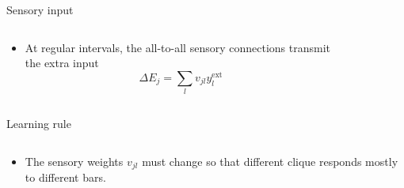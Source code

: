 \documentclass[final,hyperref={pdfpagelabels=false}]{beamer}
\begin{document}
\begin{frame}
\begin{columns}
\begin{column}{.60\textwidth}
\begin{minipage}[T]{.95\textwidth}
{\begin{block}{Sensory input}
\begin{columns}
\begin{column}[T]{.55\textwidth}
\begin{itemize}
							\item At regular intervals, the all-to-all sensory connections transmit the extra input
								\begin{equation*}
								\Delta E_j = \sum_{l} v_{jl} y_l^{\text{ext}}
								\end{equation*}
						\end{itemize}						
					\end{column}
					\begin{column}[T]{.45\textwidth}	
						\begin{figure}[T]
							
						\end{figure}
					\end{column}
				\end{columns}
			\end{block}
			\vfil
			\begin{minipage}[T]{.55\textwidth}
			\begin{block}{Learning rule}
				
				\begin{columns}
					\begin{column}[T]{1\textwidth}
						\begin{itemize}
							\item The sensory weights $v_{jl}$ must change so that different clique responds mostly to different bars.
							

\end{itemize}
\end{column}
\end{columns}
\end{block}
\end{minipage}}
\end{minipage}
\end{column}
\end{columns}
\end{frame}
\end{document}
